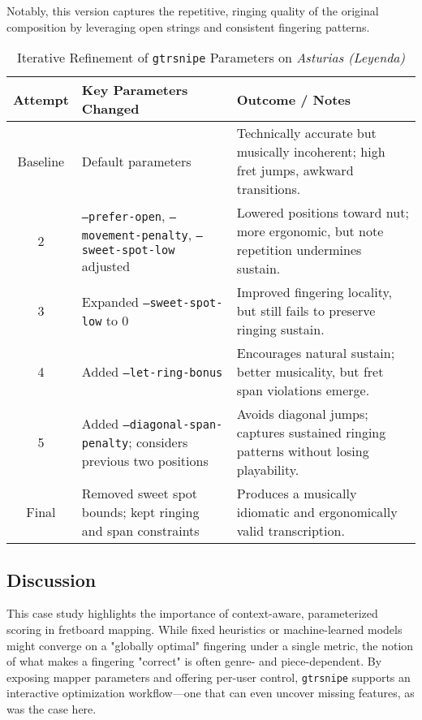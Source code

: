 \documentclass[conference]{IEEEtran}
\begin{document}
Notably, this version captures the repetitive, ringing quality of the original composition by leveraging open strings and consistent fingering patterns.

\begin{table}[htbp]
\caption{Iterative Refinement of \texttt{gtrsnipe} Parameters on \emph{Asturias (Leyenda)}}
\centering
\renewcommand{\arraystretch}{1.2}
\begin{tabular}{|c|p{3.3cm}|p{3.3cm}|}
\hline
\textbf{Attempt} & \textbf{Key Parameters Changed} & \textbf{Outcome / Notes} \\
\hline
Baseline &
Default parameters &
Technically accurate but musically incoherent; high fret jumps, awkward transitions. \\
\hline
2 &
\texttt{--prefer-open}, \texttt{--movement-penalty}, \texttt{--sweet-spot-low} adjusted &
Lowered positions toward nut; more ergonomic, but note repetition undermines sustain. \\
\hline
3 &
Expanded \texttt{--sweet-spot-low} to 0 &
Improved fingering locality, but still fails to preserve ringing sustain. \\
\hline
4 &
Added \texttt{--let-ring-bonus} &
Encourages natural sustain; better musicality, but fret span violations emerge. \\
\hline
5 &
Added \texttt{--diagonal-span-penalty}; considers previous two positions &
Avoids diagonal jumps; captures sustained ringing patterns without losing playability. \\
\hline
Final &
Removed sweet spot bounds; kept ringing and span constraints &
Produces a musically idiomatic and ergonomically valid transcription. \\
\hline
\end{tabular}
\label{tab:leyenda_tuning}
\end{table}


\subsection{Discussion}

This case study highlights the importance of context-aware, parameterized scoring in fretboard mapping. While fixed heuristics or machine-learned models might converge on a "globally optimal" fingering under a single metric, the notion of what makes a fingering "correct" is often genre- and piece-dependent. By exposing mapper parameters and offering per-user control, \texttt{gtrsnipe} supports an interactive optimization workflow—one that can even uncover missing features, as was the case here.
\end{document}
